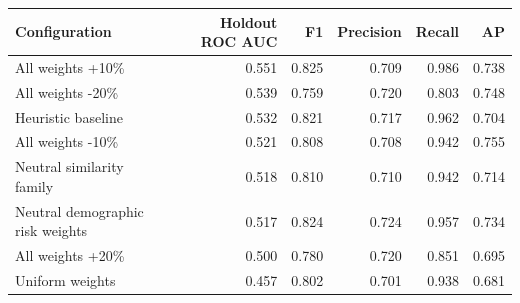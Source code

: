 \begin{tabular}{lrrrrr}
\toprule
Configuration & Holdout ROC AUC & F1 & Precision & Recall & AP \\
\midrule
All weights +10\% & 0.551 & 0.825 & 0.709 & 0.986 & 0.738 \\
All weights -20\% & 0.539 & 0.759 & 0.720 & 0.803 & 0.748 \\
Heuristic baseline & 0.532 & 0.821 & 0.717 & 0.962 & 0.704 \\
All weights -10\% & 0.521 & 0.808 & 0.708 & 0.942 & 0.755 \\
Neutral similarity family & 0.518 & 0.810 & 0.710 & 0.942 & 0.714 \\
Neutral demographic risk weights & 0.517 & 0.824 & 0.724 & 0.957 & 0.734 \\
All weights +20\% & 0.500 & 0.780 & 0.720 & 0.851 & 0.695 \\
Uniform weights & 0.457 & 0.802 & 0.701 & 0.938 & 0.681 \\
\bottomrule
\end{tabular}
